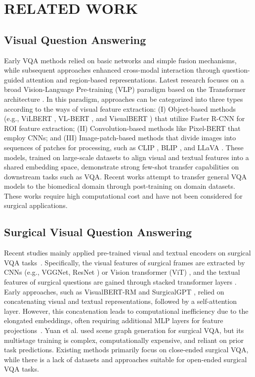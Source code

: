 \section{RELATED WORK}
\subsection{Visual Question Answering}
Early VQA methods relied on basic networks and simple fusion mechanisms, while subsequent approaches enhanced cross-modal interaction through question-guided attention and region-based representations. Latest research focuses on a broad Vision-Language Pre-training (VLP) paradigm based on the Transformer architecture \cite{vaswani2017attention}. In this paradigm, approaches can be categorized into three types according to the ways of visual feature extraction: (I) Object-based methods (e.g., ViLBERT \cite{lu2019vilbert}, VL-BERT \cite{su2020vl}, and VisualBERT \cite{li2019visualbert}) that utilize Faster R-CNN for ROI feature extraction; (II) Convolution-based methods like Pixel-BERT \cite{huang2020pixel} that employ CNNs; and (III) Image-patch-based methods that divide images into sequences of patches for processing, such as CLIP \cite{radford2021learning}, BLIP \cite{li2022blip}, and LLaVA \cite{liu2023llava}. These models, trained on large-scale datasets to align visual and textual features into a shared embedding space, demonstrate strong few-shot transfer capabilities on downstream tasks such as VQA. Recent works \cite{zhang2023biomedclip, li2024llava} attempt to transfer general VQA models to the biomedical domain through post-training on domain datasets. These works require high computational cost and have not been considered for surgical applications.

\subsection{Surgical Visual Question Answering}
Recent studies mainly applied pre-trained visual and textual encoders on surgical VQA tasks~\cite{seenivasan2022surgical, seenivasan2023surgicalgpt, yuan2024advancing, he2024pitvqa, Du2024llm}. Specifically, the visual features of surgical frames are extracted by CNNs (e.g., VGGNet, ResNet \cite{he2016deep}) or Vision transformer (ViT) \cite{dosovitskiy2021image}, and the textual features of surgical questions are gained through stacked transformer layers \cite{li2019visualbert}. Early approaches, such as VisualBERT-RM \cite{seenivasan2022surgical} and SurgicalGPT \cite{seenivasan2023surgicalgpt}, relied on concatenating visual and textual representations, followed by a self-attention layer. However, this concatenation leads to computational inefficiency due to the elongated embeddings, often requiring additional MLP layers for feature projections~\cite{seenivasan2023surgicalgpt}. Yuan et al. \cite{yuan2024advancing} used scene graph generation for surgical VQA, but its multistage training is complex, computationally expensive, and reliant on prior task predictions. Existing methods primarily focus on close-ended surgical VQA, while there is a lack of datasets and approaches suitable for open-ended surgical VQA tasks.

